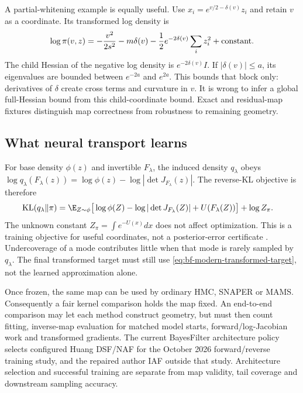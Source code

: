 A partial-whitening example is equally useful. Use
$x_i=e^{v/2-\delta(v)}z_i$ and retain $v$ as a coordinate. Its transformed
log density is
\begin{equation}
 \log\pi(v,z)=-\frac{v^2}{2s^2}-m\delta(v)
                    -\frac12e^{-2\delta(v)}\sum_i z_i^2+\hbox{constant}.
 \label{eq:bf-modern-funnel-partial}
\end{equation}
The child Hessian of the negative log density is
$e^{-2\delta(v)}I$. If $|\delta(v)|\leq a$, its eigenvalues are bounded
between $e^{-2a}$ and $e^{2a}$. This bounds that block only: derivatives of
$\delta$ create cross terms and curvature in $v$. It is wrong to infer a
global full-Hessian bound from this child-coordinate bound. Exact and
residual-map fixtures distinguish map correctness from robustness to remaining
geometry.

\subsection{What neural transport learns}

For base density $\phi(z)$ and invertible $F_\lambda$, the induced density
$q_\lambda$ obeys
$\log q_\lambda(F_\lambda(z))=\log\phi(z)-\log|\det J_{F_\lambda}(z)|$.
The reverse-KL objective is therefore
\begin{align}
 \mathrm{KL}(q_\lambda\|\pi)
 &=\E_{Z\sim\phi}\big[
      \log\phi(Z)-\log|\det J_{F_\lambda}(Z)|
                     +U(F_\lambda(Z))\big]+\log Z_\pi.
 \label{eq:bf-modern-neutra-objective}
\end{align}
The unknown constant $Z_\pi=\int e^{-U(x)}dx$ does not affect optimization.
This is a training objective for useful coordinates, not a posterior-error
certificate \citep{hoffman2019neutra}. Undercoverage of a mode contributes
little when that mode is rarely sampled by $q_\lambda$. The final transformed
target must still use \eqref{eq:bf-modern-transformed-target}, not the learned
approximation alone.

Once frozen, the same map can be used by ordinary HMC, SNAPER or MAMS.
Consequently a fair kernel comparison holds the map fixed. An end-to-end
comparison may let each method construct geometry, but must then count fitting,
inverse-map evaluation for matched model starts, forward/log-Jacobian work
and transformed gradients. The current BayesFilter architecture policy selects
configured Huang DSF/NAF for the October 2026 forward/reverse training study,
and the repaired author IAF outside that study. Architecture selection and
successful training are separate from map validity, tail coverage and
downstream sampling accuracy.

